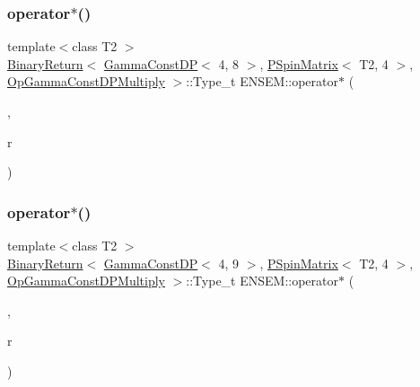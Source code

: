 \subsubsection{\texorpdfstring{operator$\ast$()}{operator*()}\hspace{0.1cm}{\footnotesize\ttfamily [41/64]}}
{\footnotesize\ttfamily template$<$class T2 $>$ \\
\mbox{\hyperlink{structENSEM_1_1BinaryReturn}{Binary\+Return}}$<$ \mbox{\hyperlink{classENSEM_1_1GammaConstDP}{Gamma\+Const\+DP}}$<$ 4, 8 $>$, \mbox{\hyperlink{classENSEM_1_1PSpinMatrix}{P\+Spin\+Matrix}}$<$ T2, 4 $>$, \mbox{\hyperlink{structENSEM_1_1OpGammaConstDPMultiply}{Op\+Gamma\+Const\+D\+P\+Multiply}} $>$\+::Type\+\_\+t E\+N\+S\+E\+M\+::operator$\ast$ (\begin{DoxyParamCaption}\item[{const \mbox{\hyperlink{classENSEM_1_1GammaConstDP}{Gamma\+Const\+DP}}$<$ 4, 8 $>$ \&}]{,  }\item[{const \mbox{\hyperlink{classENSEM_1_1PSpinMatrix}{P\+Spin\+Matrix}}$<$ T2, 4 $>$ \&}]{r }\end{DoxyParamCaption})\hspace{0.3cm}{\ttfamily [inline]}}

\mbox{\label{group__primspinmatrix_gab9e77cb7fcc24e0d8f81fc43b3274d5d}} 
\subsubsection{\texorpdfstring{operator$\ast$()}{operator*()}\hspace{0.1cm}{\footnotesize\ttfamily [42/64]}}
{\footnotesize\ttfamily template$<$class T2 $>$ \\
\mbox{\hyperlink{structENSEM_1_1BinaryReturn}{Binary\+Return}}$<$ \mbox{\hyperlink{classENSEM_1_1GammaConstDP}{Gamma\+Const\+DP}}$<$ 4, 9 $>$, \mbox{\hyperlink{classENSEM_1_1PSpinMatrix}{P\+Spin\+Matrix}}$<$ T2, 4 $>$, \mbox{\hyperlink{structENSEM_1_1OpGammaConstDPMultiply}{Op\+Gamma\+Const\+D\+P\+Multiply}} $>$\+::Type\+\_\+t E\+N\+S\+E\+M\+::operator$\ast$ (\begin{DoxyParamCaption}\item[{const \mbox{\hyperlink{classENSEM_1_1GammaConstDP}{Gamma\+Const\+DP}}$<$ 4, 9 $>$ \&}]{,  }\item[{const \mbox{\hyperlink{classENSEM_1_1PSpinMatrix}{P\+Spin\+Matrix}}$<$ T2, 4 $>$ \&}]{r }\end{DoxyParamCaption})\hspace{0.3cm}{\ttfamily [inline]}}

